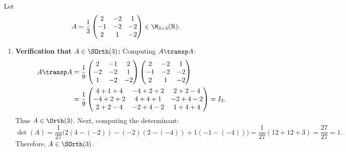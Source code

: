 \begin{exercisesolution}
\label{sol:rotation_matrix_axis_angle}
Let
\[
A = \frac{1}{3} \begin{pmatrix} 2 & -2 & 1 \\ -1 & -2 & -2 \\ 2 & 1 & -2 \end{pmatrix} \in \M_{3 \times 3}(\mathbb{R}).
\]
\begin{enumerate}[label=\textbf{(\alph*)}]
    \item \textbf{Verification that $A \in \SOrth(3)$:}
    Computing $A\transp A$:
    \begin{align*}
    A\transp A &= \frac{1}{9} \begin{pmatrix} 2 & -1 & 2 \\ -2 & -2 & 1 \\ 1 & -2 & -2 \end{pmatrix} \begin{pmatrix} 2 & -2 & 1 \\ -1 & -2 & -2 \\ 2 & 1 & -2 \end{pmatrix} \\
    &= \frac{1}{9} \begin{pmatrix} 4+1+4 & -4+2+2 & 2+2-4 \\ -4+2+2 & 4+4+1 & -2+4-2 \\ 2+2-4 & -2+4-2 & 1+4+4 \end{pmatrix} = I_3.
    \end{align*}
    Thus $A \in \Orth(3)$. Next, computing the determinant:
    \[
    \det(A) = \frac{1}{27} \Big( 2(4 - (-2)) - (-2)(2 - (-4)) + 1(-1 - (-4)) \Big) = \frac{1}{27}(12 + 12 + 3) = \frac{27}{27} = 1.
    \]
    Therefore, $A \in \SOrth(3)$.


\end{enumerate}
\end{exercisesolution}
